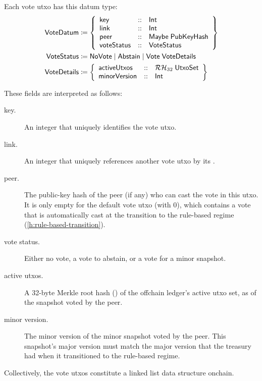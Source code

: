 \documentclass[../hydrozoa.tex]{subfiles}
\begin{document}
Each vote utxo has this datum type:
\begin{equation*}
\begin{split}
  \mathsf{VoteDatum} &\coloneq \left\{
    \begin{array}{lll}
      \mathsf{key}  &::& \mathsf{Int} \\
      \mathsf{link} &::& \mathsf{Int} \\
      \mathsf{peer} &::& \mathsf{Maybe} \; \mathsf{PubKeyHash} \\
      \mathsf{voteStatus} &::& \mathsf{VoteStatus}
    \end{array}\right\}\\
  \mathsf{VoteStatus} &\coloneq \mathsf{NoVote} \mid \mathsf{Abstain} \mid \mathsf{Vote} \; \mathsf{VoteDetails} \\
  \mathsf{VoteDetails} &\coloneq \left\{
    \begin{array}{lll}
      \mathsf{activeUtxos} &::& \mathcal{RH}_{32} \; \mathsf{UtxoSet} \\
      \mathsf{minorVersion} &::& \mathsf{Int}
    \end{array}\right\}
\end{split}
\end{equation*}

These fields are interpreted as follows:
\begin{description}
  \item[key.] An integer that uniquely identifies the vote utxo.
  \item[link.] An integer that uniquely references another vote utxo by its .
  \item[peer.] The public-key hash of the peer (if any) who can cast the vote in this utxo. It is only empty for the default vote utxo (with  0), which contains a vote that is automatically cast at the transition to the rule-based regime (\cref{h:rule-based-transition}).
  \item[vote status.] Either no vote, a vote to abstain, or a vote for a minor snapshot.
  \item[active utxos.] A 32-byte Merkle root hash () of the offchain ledger's active utxo set, as of the snapshot voted by the peer.
  \item[minor version.] The minor version of the minor snapshot voted by the peer. This snapshot's major version must match the major version that the treasury had when it transitioned to the rule-based regime.
\end{description}

Collectively, the vote utxos constitute a linked list data structure onchain.
\end{document}
